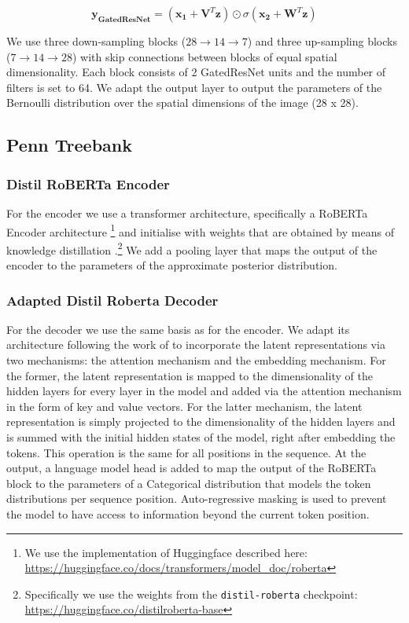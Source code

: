 \begin{equation*}
    \mathbf{y_{\text{GatedResNet}}} = (\mathbf{x_1} + \mathbf{V}^T \mathbf{z}) \odot \sigma(\mathbf{x_2} + \mathbf{W}^T \mathbf{z})
\end{equation*}

We use three down-sampling blocks ($28 \rightarrow 14 \rightarrow 7$) and three up-sampling blocks ($7 \rightarrow 14 \rightarrow 28$) with skip connections between blocks of equal spatial dimensionality. Each block consists of 2 GatedResNet units and the number of filters is set to 64. We adapt the output layer to output the parameters of the Bernoulli distribution over the spatial dimensions of the image (28 x 28).

\subsection{Penn Treebank}
\subsubsection{Distil RoBERTa Encoder} 

For the encoder we use a transformer architecture, specifically a RoBERTa Encoder architecture \cite{liu2019roberta}\footnote{We use the implementation of Huggingface described here: \url{https://huggingface.co/docs/transformers/model_doc/roberta}} and initialise with weights that are obtained by means of knowledge distillation \cite{Sanh2019DistilBERTAD}.\footnote{Specifically we use the weights from the \texttt{distil-roberta} checkpoint: \url{https://huggingface.co/distilroberta-base}} We add a pooling layer that maps the output of the encoder to the parameters of the approximate posterior distribution.

\subsubsection{Adapted Distil Roberta Decoder} 
For the decoder we use the same basis as for the encoder. We adapt its architecture following the work of \cite{li2020optimus} to incorporate the latent representations via two mechanisms: the attention mechanism and the embedding mechanism. For the former, the latent representation is mapped to the dimensionality of the hidden layers for every layer in the model and added via the attention mechanism in the form of key and value vectors. For the latter mechanism, the latent representation is simply projected to the dimensionality of the hidden layers and is summed with the initial hidden states of the model, right after embedding the tokens. This operation is the same for all positions in the sequence. At the output, a language model head is added to map the output of the RoBERTa block to the parameters of a Categorical distribution that models the token distributions per sequence position. Auto-regressive masking is used to prevent the model to have access to information beyond the current token position.


